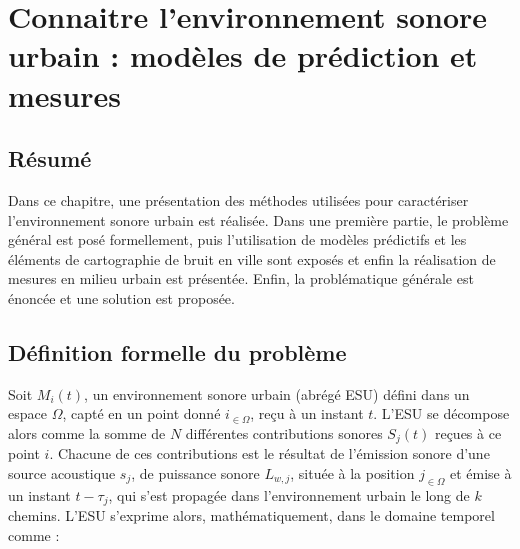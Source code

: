 \chapter{Connaitre l'environnement sonore urbain : modèles de prédiction et mesures}\label{chap:modele}
\thispagestyle{empty}

\section*{\centering Résumé}



\vspace{2cm}

Dans ce chapitre, une présentation des méthodes utilisées pour caractériser l'environnement sonore urbain est réalisée. Dans une première partie, le problème général est posé formellement, puis l'utilisation de modèles prédictifs et les éléments de cartographie de bruit en ville sont exposés et enfin la réalisation de mesures en milieu urbain est présentée. Enfin, la problématique générale est énoncée et une solution est proposée.

\section{Définition formelle du problème}\label{part:problème}

Soit $M_{i}(t)$, un environnement sonore urbain (abrégé ESU) défini dans un espace $\Omega$, capté en un point donné $i_{\in \Omega}$, reçu à un instant $t$. L'ESU se décompose alors comme la somme de $N$ différentes contributions sonores $S_j(t)$ reçues à ce point $i$. Chacune de ces contributions est le résultat de l'émission sonore d'une source acoustique $s_j$, de puissance sonore $L_{w,j}$, située à la position $j_{\in \Omega}$ et émise à un instant $t-\tau_j$,  qui s'est propagée dans l'environnement urbain le long de $k$ chemins. L'ESU s'exprime alors, mathématiquement, dans le domaine temporel comme :

